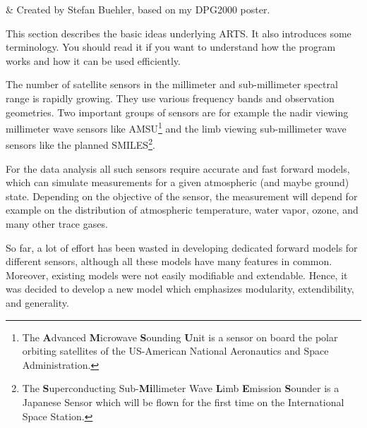 %
%
 \label{sec:concept}

%
%
 & Created by Stefan Buehler, based on my DPG2000 poster.
\stophistory

%
%
%

%
%
This section describes the basic ideas underlying ARTS. It also
introduces some terminology. You should read it if you want
to understand how the program works and how it can be used
efficiently.

\label{sec:concept:intro}

The number of satellite sensors in the millimeter and sub-millimeter
spectral range is rapidly growing. They use various frequency
bands and observation geometries. Two important groups of
sensors are for example the nadir viewing millimeter wave
sensors like AMSU\footnote{The \textbf{A}dvanced
  \textbf{M}icrowave \textbf{S}ounding \textbf{U}nit is a
  sensor on board the polar orbiting satellites of the
  US-American National Aeronautics and Space Administration.}
and the limb viewing sub-millimeter wave sensors like the
planned SMILES\footnote{The \textbf{S}uperconducting
  Sub-\textbf{Mi}llimeter Wave \textbf{L}imb \textbf{E}mission
  \textbf{S}ounder is a Japanese Sensor which will be flown
  for the first time on the International Space Station.}.

For the data analysis all such sensors require accurate and
fast forward models, which can simulate measurements for a
given atmospheric (and maybe ground) state. Depending on the
objective of the sensor, the measurement will depend for
example on the distribution of atmospheric temperature, water
vapor, ozone, and many other trace gases.

So far, a lot of effort has been wasted in developing
dedicated forward models for different sensors, although all
these models have many features in common. Moreover, existing
models were not easily modifiable and extendable. Hence, it
was decided to develop a new model which emphasizes
modularity, extendibility, and generality.


